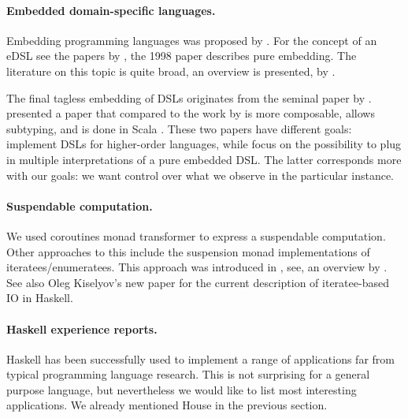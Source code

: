 \paragraph{Embedded domain-specific languages.}
Embedding programming languages was proposed by \citeauthor{Landin:1966:NPL:365230.365257} \cite{Landin:1966:NPL:365230.365257}.
For the concept of an eDSL see the papers by \citeauthor{hudak1} \cite{hudak1,hudak2}, the 1998 paper describes pure embedding.
The literature on this topic is quite broad, an overview is presented, \eg by \citeauthor{dsl-survey} \cite{dsl-survey}.

The final tagless embedding of DSLs originates from the seminal paper by \citeauthor{final_tagless_embedding} \cite{final_tagless_embedding}.
\citeauthor{Hofer:2008:PED:1449913.1449935} \cite{Hofer:2008:PED:1449913.1449935} presented a paper that compared to the work by \citeauthor{final_tagless_embedding} \cite{final_tagless_embedding} is more composable, allows subtyping, and is done in Scala \cite{odersky2008programming}.
These two papers have different goals: \citeauthor{final_tagless_embedding} implement DSLs for higher-order languages, while \citeauthor{Hofer:2008:PED:1449913.1449935} focus on the possibility to plug in multiple interpretations of a pure embedded DSL.
The latter corresponds more with our goals: we want control over what we observe in the particular instance.

\paragraph{Suspendable computation.} We used coroutines monad transformer \cite{cmt} to express a suspendable computation.
Other approaches to this include the suspension monad implementations of iteratees/enumeratees. This approach was introduced in \cite{oleg-iteratee}, see, \eg an overview by \citeauthor{lato2010iteratee} \cite{lato2010iteratee}.
See also Oleg Kiselyov's new paper \cite{springerlink:10.1007/978-3-642-29822-6_15} for the current description of iteratee-based IO in Haskell.

\paragraph{Haskell experience reports.}
Haskell has been successfully used to implement a range of applications far from typical programming language research.
This is not surprising for a general purpose language, but nevertheless we would like to list most interesting applications.
We already mentioned House \cite{house} in the previous section.

